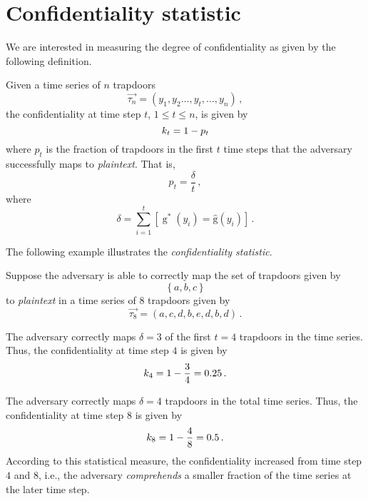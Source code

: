 \documentclass[ ../main.tex]{subfiles}
\begin{document}
\section{Confidentiality statistic}
\label{sec:bootstrap}
We are interested in measuring the degree of confidentiality as given by the following definition.
\begin{definition}
Given a time series of $n$ trapdoors
\begin{equation}
    \vec{\tau_n} = \left(y_1,y_2\ldots,y_t, \ldots, y_n\right)\,,
\end{equation}
the confidentiality at time step $t$, $1 \leq t \leq n$, is given by
\begin{equation}
\label{eq:conf_metric}
    k_t = 1 - p_t
\end{equation}
where $p_t$ is the fraction of trapdoors in the first $t$ time steps that the adversary successfully maps to \emph{plaintext}. That is,
\begin{equation}
\label{eq:accuracy}
    p_t = \frac{\delta}{t}\,,
\end{equation}
where
\begin{equation}
    \delta = \sum_{i=1}^{t} \left[\operatorname{g}^*(y_i) = \operatorname{\hat{g}}(y_i)\right]\,.
\end{equation}
\end{definition}
The following example illustrates the \emph{confidentiality statistic}.
\begin{example}
Suppose the adversary is able to correctly map the set of trapdoors given by
\begin{equation}
    \left\{ a, b, c \right\}
\end{equation}
to \emph{plaintext} in a time series of $8$ trapdoors given by
\begin{equation}
    \vec{\tau_8} = \left(a, c, d, b, e, d, b, d\right)\,.
\end{equation}

The adversary correctly maps $\delta = 3$ of the first $t = 4$ trapdoors in the time series. Thus, the confidentiality at time step $4$ is given by
\begin{equation}
    k_4 = 1 - \frac{3}{4} = 0.25\,.
\end{equation}

The adversary correctly maps $\delta = 4$ trapdoors in the total time series. Thus, the confidentiality at time step $8$ is given by
\begin{equation}
    k_8 = 1 - \frac{4}{8} = 0.5\,.
\end{equation}
According to this statistical measure, the confidentiality increased from time step $4$ and $8$, i.e., the adversary \emph{comprehends} a smaller fraction of the time series at the later time step.
\end{example}
\end{document}
